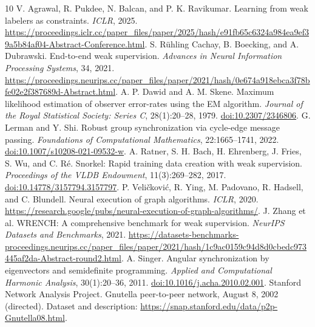 \documentclass[10pt]{article}
\begin{document}
\begin{thebibliography}{10}
 V. Agrawal, R. Pukdee, N. Balcan, and P. K. Ravikumar. Learning from weak labelers as constraints. \emph{ICLR}, 2025. \url{https://proceedings.iclr.cc/paper_files/paper/2025/hash/e91fb65c6324a984ea9ef39a5b84af04-Abstract-Conference.html}.
 S. R\"uhling Cachay, B. Boecking, and A. Dubrawski. End-to-end weak supervision. \emph{Advances in Neural Information Processing Systems}, 34, 2021. \url{https://proceedings.neurips.cc/paper_files/paper/2021/hash/0e674a918ebca3f78bfe02e2f387689d-Abstract.html}.
 A. P. Dawid and A. M. Skene. Maximum likelihood estimation of observer error-rates using the EM algorithm. \emph{Journal of the Royal Statistical Society: Series C}, 28(1):20--28, 1979. \href{https://doi.org/10.2307/2346806}{doi:10.2307/2346806}.
 G. Lerman and Y. Shi. Robust group synchronization via cycle-edge message passing. \emph{Foundations of Computational Mathematics}, 22:1665--1741, 2022. \href{https://doi.org/10.1007/s10208-021-09532-w}{doi:10.1007/s10208-021-09532-w}.
 A. Ratner, S. H. Bach, H. Ehrenberg, J. Fries, S. Wu, and C. R\'e. Snorkel: Rapid training data creation with weak supervision. \emph{Proceedings of the VLDB Endowment}, 11(3):269--282, 2017. \href{https://doi.org/10.14778/3157794.3157797}{doi:10.14778/3157794.3157797}.
 P. Veli\v{c}kovi\'c, R. Ying, M. Padovano, R. Hadsell, and C. Blundell. Neural execution of graph algorithms. \emph{ICLR}, 2020. \url{https://research.google/pubs/neural-execution-of-graph-algorithms/}.
 J. Zhang et al. WRENCH: A comprehensive benchmark for weak supervision. \emph{NeurIPS Datasets and Benchmarks}, 2021. \url{https://datasets-benchmarks-proceedings.neurips.cc/paper_files/paper/2021/hash/1c9ac0159c94d8d0cbedc973445af2da-Abstract-round2.html}.
 A. Singer. Angular synchronization by eigenvectors and semidefinite programming. \emph{Applied and Computational Harmonic Analysis}, 30(1):20--36, 2011. \href{https://doi.org/10.1016/j.acha.2010.02.001}{doi:10.1016/j.acha.2010.02.001}.
 Stanford Network Analysis Project. Gnutella peer-to-peer network, August 8, 2002 (directed). Dataset and description: \url{https://snap.stanford.edu/data/p2p-Gnutella08.html}.
\end{thebibliography}
\end{document}
